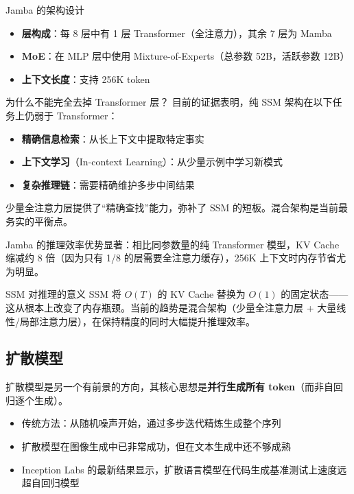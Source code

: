 \documentclass[a4paper]{article}
\begin{document}
\begin{importantbox}{Jamba 的架构设计}
\begin{itemize}
    \item \textbf{层构成}：每 8 层中有 1 层 Transformer（全注意力），其余 7 层为 Mamba
    \item \textbf{MoE}：在 MLP 层中使用 Mixture-of-Experts（总参数 52B，活跃参数 12B）
    \item \textbf{上下文长度}：支持 256K token
\end{itemize}
\end{importantbox}

\begin{warningbox}{为什么不能完全去掉 Transformer 层？}
目前的证据表明，纯 SSM 架构在以下任务上仍弱于 Transformer：
\begin{itemize}
    \item \textbf{精确信息检索}：从长上下文中提取特定事实
    \item \textbf{上下文学习}（In-context Learning）：从少量示例中学习新模式
    \item \textbf{复杂推理链}：需要精确维护多步中间结果
\end{itemize}
少量全注意力层提供了``精确查找''能力，弥补了 SSM 的短板。混合架构是当前最务实的平衡点。
\end{warningbox}

Jamba 的推理效率优势显著：相比同参数量的纯 Transformer 模型，KV Cache 缩减约 8 倍（因为只有 1/8 的层需要全注意力缓存），256K 上下文时内存节省尤为明显。

\begin{importantbox}{SSM 对推理的意义}
SSM 将 $O(T)$ 的 KV Cache 替换为 $O(1)$ 的固定状态——这从根本上改变了内存瓶颈。当前的趋势是混合架构（少量全注意力层 + 大量线性/局部注意力层），在保持精度的同时大幅提升推理效率。
\end{importantbox}

\subsection{扩散模型}

扩散模型是另一个有前景的方向，其核心思想是\textbf{并行生成所有 token}（而非自回归逐个生成）。

\begin{itemize}
    \item 传统方法：从随机噪声开始，通过多步迭代精炼生成整个序列
    \item 扩散模型在图像生成中已非常成功，但在文本生成中还不够成熟
    \item Inception Labs 的最新结果显示，扩散语言模型在代码生成基准测试上速度远超自回归模型
\end{itemize}
\end{document}
